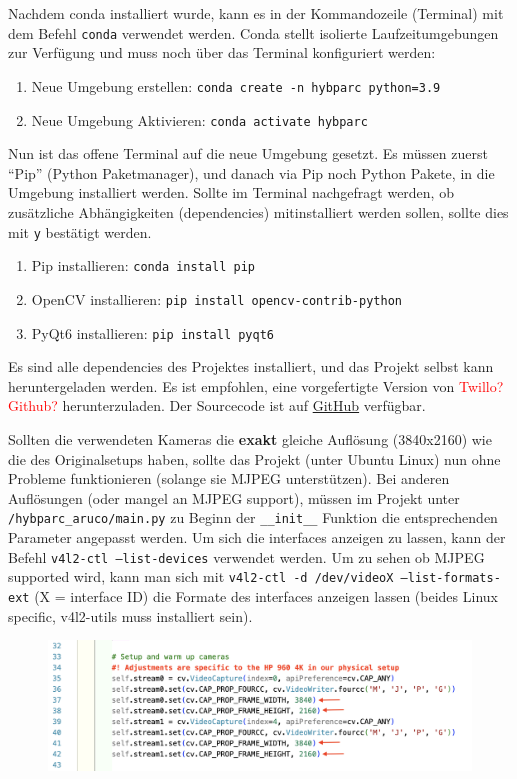 \documentclass[a4paper]{article}
\newcommand{\warn}[1]{\textcolor{red}{#1}}
\newcommand{\code}[1]{\texttt{#1}}
\begin{document}
Nachdem conda installiert wurde, kann es in der Kommandozeile (Terminal) mit dem Befehl \code{conda} verwendet werden. Conda stellt isolierte Laufzeitumgebungen zur Verfügung und muss noch über das Terminal konfiguriert werden:
\begin{enumerate}
    \item Neue Umgebung erstellen: \code{conda create -n hybparc python=3.9}
    \item Neue Umgebung Aktivieren: \code{conda activate hybparc}
\end{enumerate}

Nun ist das offene Terminal auf die neue Umgebung gesetzt. Es müssen zuerst \enquote{Pip} (Python Paketmanager), und danach via Pip noch Python Pakete, in die Umgebung installiert werden. Sollte im Terminal nachgefragt werden, ob zusätzliche Abhängigkeiten (dependencies) mitinstalliert werden sollen, sollte dies mit \code{y} bestätigt werden.

\begin{enumerate}
    \item Pip installieren: \code{conda install pip}
    \item OpenCV installieren: \code{pip install opencv-contrib-python}
    \item PyQt6 installieren: \code{pip install pyqt6}
\end{enumerate}

Es sind alle dependencies des Projektes installiert, und das Projekt selbst kann heruntergeladen werden. Es ist empfohlen, eine vorgefertigte Version von \warn{Twillo? Github?} herunterzuladen. Der Sourcecode ist auf \href{https://github.com/leloomi/hybparc_aruco}{GitHub} verfügbar.

Sollten die verwendeten Kameras die \textbf{exakt} gleiche Auflösung (3840x2160) wie die des Originalsetups haben, sollte das Projekt (unter Ubuntu Linux) nun ohne Probleme funktionieren (solange sie MJPEG unterstützen). Bei anderen Auflösungen (oder mangel an MJPEG support), müssen im Projekt unter \code{/hybparc\_aruco/main.py} zu Beginn der \code{\_\_init\_\_} Funktion die entsprechenden Parameter angepasst werden.
Um sich die interfaces anzeigen zu lassen, kann der Befehl \code{v4l2-ctl --list-devices} verwendet werden.
Um zu sehen ob MJPEG supported wird, kann man sich mit \code{v4l2-ctl -d /dev/videoX --list-formats-ext} (X = interface ID) die Formate des interfaces anzeigen lassen (beides Linux specific, v4l2-utils muss installiert sein).
\begin{figure}[h]
    \includegraphics[width=\textwidth]{stream_properties.png}
\end{figure}
\end{document}
